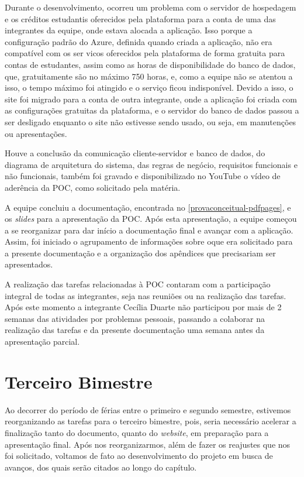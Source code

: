 Durante o desenvolvimento, ocorreu um problema com o servidor de hospedagem e os créditos estudantis oferecidos pela plataforma para a conta de uma das integrantes da equipe, onde estava alocada a aplicação. Isso porque a configuração padrão do Azure, definida quando criada a aplicação, não era compatível com os ser vicos oferecidos pela plataforma de forma gratuita para contas de estudantes, assim como as horas de disponibilidade do banco de dados, que, gratuitamente são no máximo 750 horas, e, como a equipe não se atentou a isso, o tempo máximo foi atingido e o serviço ficou indisponível. Devido a isso, o site foi migrado para a conta de outra integrante, onde a aplicação foi criada com as configurações gratuitas da plataforma, e o servidor do banco de dados passou a ser desligado enquanto o site não estivesse sendo usado, ou seja, em manutenções ou apresentações.

Houve a conclusão da comunicação cliente-servidor e banco de dados, do diagrama de arquitetura do sistema, das regras de negócio, requisitos funcionais e não funcionais, também foi gravado e disponibilizado no \gls{YouTube} o vídeo de aderência da \ac{POC}, como solicitado pela matéria.

A equipe concluiu a documentação, encontrada no \autoref{provaconceitual-pdfpages}, e os \textit{slides} para a apresentação da \ac{POC}. Após esta apresentação, a equipe começou a se reorganizar para dar início a documentação final e avançar com a aplicação. Assim, foi iniciado o agrupamento de informações sobre oque era solicitado para a presente documentação e a organização dos apêndices que precisariam ser apresentados.

A realização das tarefas relacionadas à \ac{POC} contaram com a participação integral de todas as integrantes, seja nas reuniões ou na realização das tarefas. Após este momento a integrante Cecília Duarte não participou por mais de 2 semanas das atividades por problemas pessoais, passando a colaborar na realização das tarefas e da presente documentação uma semana antes da apresentação parcial.

\section{Terceiro Bimestre}
Ao decorrer do período de férias entre o primeiro e segundo semestre, estivemos reorganizando as tarefas para o terceiro bimestre, pois, seria necessário acelerar a finalização tanto do documento, quanto do \textit{website}, em preparação para a apresentação final. Após nos reorganizarmos, além de fazer os reajustes que nos foi solicitado, voltamos de fato ao desenvolvimento do projeto em busca de avanços, dos quais serão citados ao longo do capítulo.


